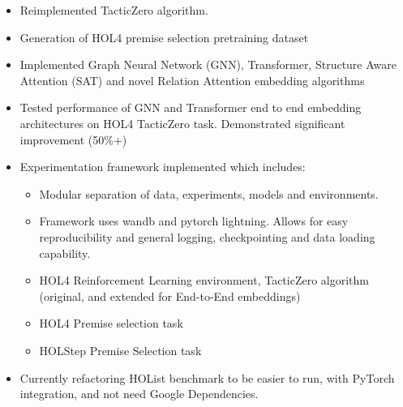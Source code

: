 \documentclass{article}
\begin{document}
    \begin{itemize}
        \item Reimplemented TacticZero algorithm.
        \item Generation of HOL4 premise selection pretraining dataset
        \item Implemented Graph Neural Network (GNN), Transformer, Structure Aware Attention (SAT) and novel Relation Attention embedding algorithms
        \item Tested performance of GNN and Transformer end to end embedding architectures on HOL4 TacticZero task.
        Demonstrated significant improvement (50\%+)
        \item Experimentation framework implemented which includes:
        \begin{itemize}
            \item Modular separation of data, experiments, models and environments.
            \item Framework uses wandb and pytorch lightning.
            Allows for easy reproducibility and general logging, checkpointing and data loading capability.
            \item HOL4 Reinforcement Learning environment, TacticZero algorithm (original, and extended for End-to-End embeddings)
            \item HOL4 Premise selection task
            \item HOLStep Premise Selection task
        \end{itemize}
        \item Currently refactoring HOList benchmark to be easier to run, with PyTorch integration, and not need Google Dependencies.
    \end{itemize}


    \printbibliography
\end{document}
